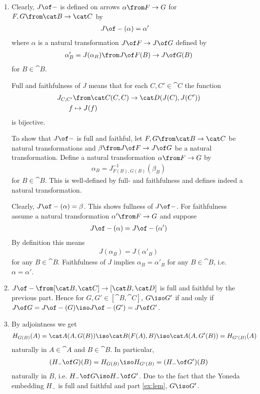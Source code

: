\begin{answer}
  \begin{enumerate}
  \item Clearly, $J\of-$ is defined on arrows $\alpha\from F\to G$ for $F,G\from\cat B\to\cat C$ by
    \begin{align*}
      J\of -(\alpha)&=\alpha'
    \end{align*} 
    where $\alpha$ is a natural transformation $J\of F\to J\of G$ defined by
    \begin{align*}
      \alpha'_B=J(\alpha_B)\from J\of F(B)\to J\of G(B)
    \end{align*}
    for $B\in\cat B$.

    Full and faithfulness of $J$ means that for each $C,C'\in\cat C$ the function
    \begin{align*}
      J_{C,C'}&\from\cat C(C,C)\to \cat D(J(C),J(C'))\\
      f&\mapsto J(f)
    \end{align*}
    is bijective.

    To show that $J\of-$ is full and faithful, let $F,G\from\cat B\to\cat C$ be natural transformations and $\beta\from J\of F\to J\of G$ be a natural transformation.
    Define a natural transformation $\alpha\from F\to G$ by 
    \begin{align*}
      \alpha_B=J_{F(B),G(B)}^{-1}(\beta_B)
    \end{align*}
    for $B\in\cat B$. This is well-defined by full- and faithfulness and defines indeed a natural transformation.

    Clearly, $J\of -(\alpha)=\beta$. This shows fullness of $J\of -$. For faithfulness assume a natural transformation $\alpha'\from F\to G$ and suppose 
    \begin{align*}
      J\of-(\alpha)=J\of-(\alpha')
    \end{align*}
    By definition this means
    \begin{align*}
      J(\alpha_B)=J(\alpha'_B)
    \end{align*}
    for any $B\in\cat B$. Faithfulness of $J$ implies $\alpha_B=\alpha'_B$ for any $B\in\cat B$, i.e. $\alpha=\alpha'$.
  \item \label{ex:lem} $J\of -\from[\cat B,\cat C]\to [\cat B,\cat D]$ is full and faithful by the previous part. Hence for $G,G'\in [\cat B,\cat C]$, $G\iso G'$ if and only if $J\of G=J\of-(G)\iso J\of-(G')=J\of G'$.
  \item By adjointness we get
    \begin{align*}
      H_{G(B)}(A)=\cat A(A,G(B))\iso\cat B(F(A),B)\iso\cat A(A,G'(B))=H_{G'(B)}(A)
    \end{align*}
    naturally in $A\in\cat A$ and $B\in\cat B$. In particular,
    \begin{align*}
      (H_-\of G)(B)=H_{G(B)}\iso H_{G'(B)}=(H_-\of G')(B)
    \end{align*}
    naturally in $B$, i.e. $H_-\of G\iso H_-\of G'$. Due to the fact that the Yoneda embedding $H_-$ is full and faithful and part \ref{ex:lem}, $G\iso G'$.


\end{enumerate}
\end{answer}
